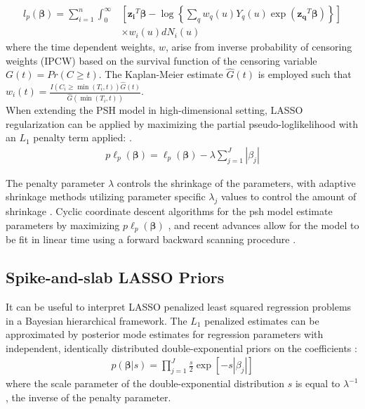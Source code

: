 \documentclass[11pt,a4paper]{article}
\let\cite\parencite
\begin{document}
\begin{align*}
    l_p(\boldsymbol{\beta}) = \sum_{i=1}^n \int_0^{\infty} &\left[\mathbf{z_i}^T\boldsymbol{\beta}-\log \left\{ \sum_q w_q(u)Y_q(u) \exp (\mathbf{z_q}^T\boldsymbol{\beta}) \right\}  \right] \\ &\times w_i(u)dN_i(u)
\end{align*}
\noindent
where the time dependent weights, $w$, arise from inverse probability of censoring weights (IPCW) \cite{RobinsRotnitsky1992} based on the survival function of the censoring variable $G(t) = Pr(C \ge t)$. The Kaplan-Meier estimate $\hat{G}(t)$ is employed such that $w_i(t) = \frac{I(C_i \ge \min(T_i, t))\hat{G}(t)}{\hat{G}(\min(T_i, t))}$.\\


When extending the PSH model in high-dimensional setting, LASSO regularization can be applied by maximizing the partial pseudo-loglikelihood with an $L_1$ penalty term applied: \cite{Hastie2015, Simon2011, Tibshirani1997, Fu2017}.
\begin{align*}
    p\ell_p(\boldsymbol{\beta}) = \ell_p(\boldsymbol{\beta}) - \lambda\sum_{j=1}^J|\beta_j|
\end{align*}

The penalty parameter $\lambda$ controls the shrinkage of the parameters, with adaptive shrinkage methods utilizing parameter specific $\lambda_j$ values to control the amount of shrinkage \cite{Zou2006, ZhangLu2007}. Cyclic coordinate descent algorithms for the psh model estimate parameters by maximizing $p\ell_p(\boldsymbol{\beta})$ \cite{Fu2017}, and recent advances allow for the model to be fit in linear time using a forward backward scanning procedure \cite{Kawaguchi2021, Kawaguchi2020}. 

\subsection{Spike-and-slab LASSO Priors}
It can be useful to interpret LASSO penalized least squared regression problems in a Bayesian hierarchical framework. The $L_1$ penalized estimates can be approximated by posterior mode estimates for regression parameters with independent, identically distributed double-exponential priors on the coefficients \cite{ParkCasella2008, YiXu2008}:
\begin{align*}
    p(\boldsymbol{\beta}|s)= \prod_{j=1}^J \frac{s}{2}\exp[-s|\beta_j|] 
\end{align*}
\noindent
where the scale parameter of the double-exponential distribution $s$ is equal to $\lambda^{-1}$, the inverse of the penalty parameter. 
\end{document}
